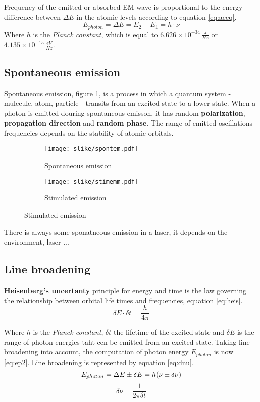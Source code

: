 Frequency of the emitted or absorbed EM-wave is proportional to the
energy difference between $\Delta E$ in the atomic levels according to equation \ref{eq:aeeq}.
\begin{equation}
    E_{photon} = \Delta E = E_2 - E_1 = h \cdot \nu
    \label{eq:aeeq}
\end{equation}
Where $h$ is the \textit{Planck constant}, which is equal to  $6.626 \times 10^{-34} \, \frac{J}{Hz}$ or $4.135 \times 10^{-15} \,\frac{eV}{Hz}$.


\subsection{Spontaneous emission}

Spontaneous emission, figure \ref{fig:spem}, is a process in which a quantum system - mulecule, atom, particle - 
transits from an excited state to a lower state.  When a photon is emitted douring spontaneous emisson, it has random \textbf{polarization}, \textbf{propagation direction} and \textbf{random phase}.
The range of emitted oscillations frequencies depends on the stability of atomic orbitals.
\begin{figure}[h!]
    \centering
    \begin{subfigure}{0.4\textwidth}
        \texttt{[image: slike/spontem.pdf]}
        \caption{Spontaneous emission}
        \label{fig:spem}
    \end{subfigure}
    \begin{subfigure}{0.4\textwidth}
        \texttt{[image: slike/stimemm.pdf]}
        \caption{Stimulated emission}
        \label{fig:stimem}
    \end{subfigure}
\end{figure}

There is always some sponatneous emission in a laser, it depends on the environment, laser ...


\subsection{Line broadening}

\textbf{Heisenberg's uncertanty} principle for energy and time is the law governing the relationship between orbital life times and frequencies, equation \ref{eq:heis}.
\begin{equation}
    \delta E \cdot \delta t = \frac{h}{4 \pi}
    \label{eq:heis}
\end{equation}

Where $h$ is the \textit{Planck constant}, $\delta t$ the lifetime of the excited state and $\delta E$ is the range of photon energies taht cen be emitted from an excited state.
Taking line broadening into account, the computation of photon energy $E_{photon}$ is now \ref{eq:ep2}.
Line broadening is represented by equation \ref{eq:dnu}.
\begin{equation}
    E_{photon} = \Delta E \pm \delta E = h (\nu \pm \delta \nu) \\
    \label{eq:ep2}
\end{equation}
\begin{equation}
    \delta \nu = \frac{1}{2 \pi \delta t}
    \label{eq:dnu}
\end{equation}
